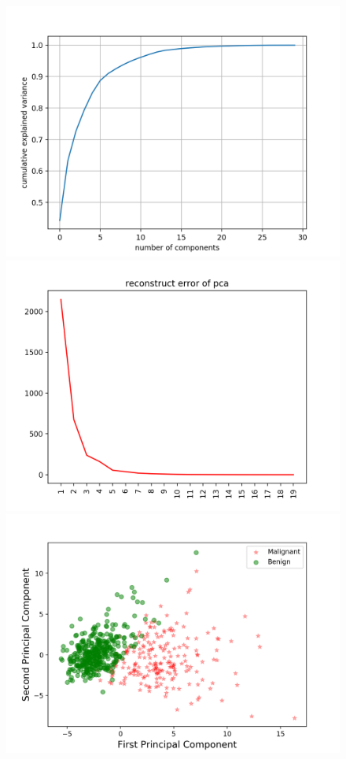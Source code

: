 \documentclass[a4paper,12pt]{article}
\begin{document}
\begin{figure}[!htb]
   \begin{minipage}{0.33\textwidth}
     \centering
     \includegraphics[width=.95\linewidth]{pca_data_set11}
   \end{minipage}\hfill
    \begin{minipage}{0.33\textwidth}
     \centering
     \includegraphics[width=.95\linewidth]{reconstruction_pca_dataset1}
     \end{minipage}\hfill
     \begin{minipage}{0.33\textwidth}
     \centering
     \includegraphics[width=.95\linewidth]{pca_d1_2}

\end{minipage}
\end{figure}
\end{document}
